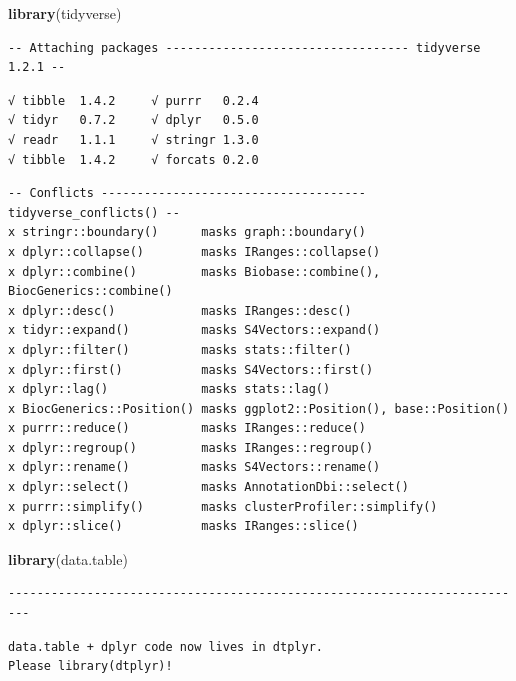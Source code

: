\documentclass[]{article}
\newenvironment{Shaded}{\begin{snugshade}}{\end{snugshade}}
\newcommand{\KeywordTok}[1]{\textcolor[rgb]{0.13,0.29,0.53}{\textbf{#1}}}
\newcommand{\NormalTok}[1]{#1}
\begin{document}
\begin{verbatim}
\end{verbatim}

\begin{Shaded}
\begin{Highlighting}[]
\KeywordTok{library}\NormalTok{(tidyverse)}
\end{Highlighting}
\end{Shaded}

\begin{verbatim}
-- Attaching packages ---------------------------------- tidyverse 1.2.1 --
\end{verbatim}

\begin{verbatim}
√ tibble  1.4.2     √ purrr   0.2.4
√ tidyr   0.7.2     √ dplyr   0.5.0
√ readr   1.1.1     √ stringr 1.3.0
√ tibble  1.4.2     √ forcats 0.2.0
\end{verbatim}

\begin{verbatim}
-- Conflicts ------------------------------------- tidyverse_conflicts() --
x stringr::boundary()      masks graph::boundary()
x dplyr::collapse()        masks IRanges::collapse()
x dplyr::combine()         masks Biobase::combine(), BiocGenerics::combine()
x dplyr::desc()            masks IRanges::desc()
x tidyr::expand()          masks S4Vectors::expand()
x dplyr::filter()          masks stats::filter()
x dplyr::first()           masks S4Vectors::first()
x dplyr::lag()             masks stats::lag()
x BiocGenerics::Position() masks ggplot2::Position(), base::Position()
x purrr::reduce()          masks IRanges::reduce()
x dplyr::regroup()         masks IRanges::regroup()
x dplyr::rename()          masks S4Vectors::rename()
x dplyr::select()          masks AnnotationDbi::select()
x purrr::simplify()        masks clusterProfiler::simplify()
x dplyr::slice()           masks IRanges::slice()
\end{verbatim}

\begin{Shaded}
\begin{Highlighting}[]
\KeywordTok{library}\NormalTok{(data.table)}
\end{Highlighting}
\end{Shaded}

\begin{verbatim}
-------------------------------------------------------------------------
\end{verbatim}

\begin{verbatim}
data.table + dplyr code now lives in dtplyr.
Please library(dtplyr)!
\end{verbatim}
\end{document}
